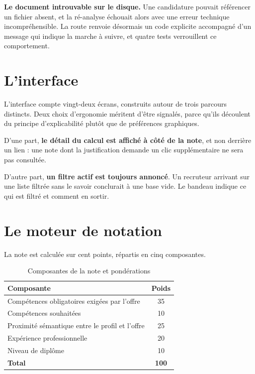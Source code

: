 \documentclass[12pt,a4paper]{report}
\begin{document}
\textbf{Le document introuvable sur le disque.} Une candidature pouvait
référencer un fichier absent, et la ré-analyse échouait alors avec une erreur
technique incompréhensible. La route renvoie désormais un code explicite
accompagné d'un message qui indique la marche à suivre, et quatre tests
verrouillent ce comportement.

\section{L'interface}

L'interface compte vingt-deux écrans, construits autour de trois parcours
distincts. Deux choix d'ergonomie méritent d'être signalés, parce qu'ils
découlent du principe d'explicabilité plutôt que de préférences graphiques.

D'une part, \textbf{le détail du calcul est affiché à côté de la note}, et non
derrière un lien : une note dont la justification demande un clic
supplémentaire ne sera pas consultée.

D'autre part, \textbf{un filtre actif est toujours annoncé}. Un recruteur
arrivant sur une liste filtrée sans le savoir conclurait à une base vide. Le
bandeau indique ce qui est filtré et comment en sortir.

\section{Le moteur de notation}

La note est calculée sur cent points, répartis en cinq composantes.

\begin{table}[H]
\centering
\caption{Composantes de la note et pondérations}
\label{tab:poids}
\begin{tabular}{@{}lc@{}}
\toprule
\textbf{Composante} & \textbf{Poids} \\
\midrule
Compétences obligatoires exigées par l'offre & 35 \\
Compétences souhaitées & 10 \\
Proximité sémantique entre le profil et l'offre & 25 \\
Expérience professionnelle & 20 \\
Niveau de diplôme & 10 \\
\midrule
\textbf{Total} & \textbf{100} \\
\bottomrule
\end{tabular}
\end{table}
\end{document}
